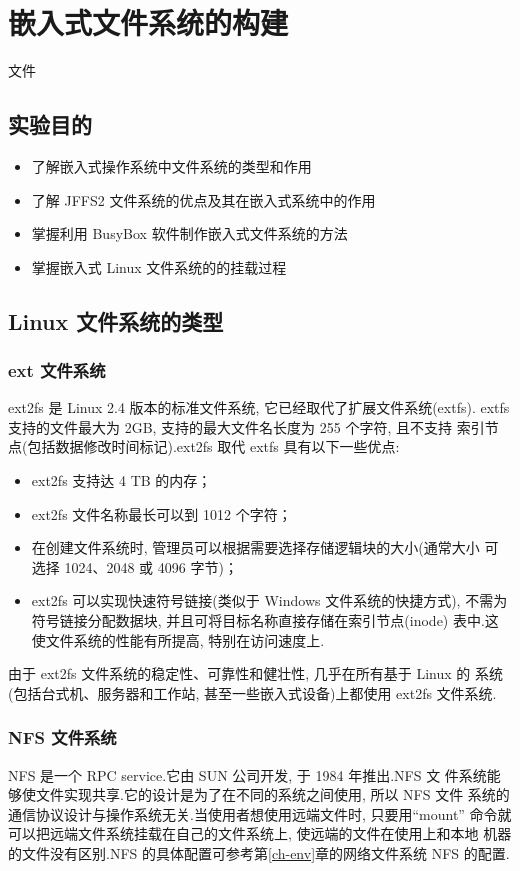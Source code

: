 \chapter{嵌入式文件系统的构建}{文件}\label{ch-fs}

\section{实验目的}
\begin{itemize}\itemsep=-3pt
  \item 了解嵌入式操作系统中文件系统的类型和作用
  \item 了解 JFFS2 文件系统的优点及其在嵌入式系统中的作用
  \item 掌握利用 BusyBox 软件制作嵌入式文件系统的方法
  \item 掌握嵌入式 Linux 文件系统的的挂载过程
\end{itemize}

\section{Linux 文件系统的类型}
\subsection{ext 文件系统}
	ext2fs 是 Linux 2.4 版本的标准文件系统, 它已经取代了扩展文件系统(extfs).
extfs 支持的文件最大为 2GB, 支持的最大文件名长度为 255 个字符, 且不支持
索引节点(包括数据修改时间标记).ext2fs 取代 extfs 具有以下一些优点:
\begin{itemize}\itemsep=-3pt
  \item ext2fs 支持达 4 TB 的内存；
  \item ext2fs 文件名称最长可以到 1012 个字符；
  \item 在创建文件系统时, 管理员可以根据需要选择存储逻辑块的大小(通常大小
		可选择 1024、2048 或 4096 字节)；
  \item ext2fs 可以实现快速符号链接(类似于 Windows 文件系统的快捷方式), 
		不需为符号链接分配数据块, 并且可将目标名称直接存储在索引节点(inode)
		表中.这使文件系统的性能有所提高, 特别在访问速度上.
\end{itemize}
	由于 ext2fs 文件系统的稳定性、可靠性和健壮性, 几乎在所有基于 Linux 的
系统(包括台式机、服务器和工作站, 甚至一些嵌入式设备)上都使用 ext2fs 文件系统.

\subsection{NFS 文件系统}
	NFS 是一个 RPC service.它由 SUN 公司开发, 于 1984 年推出.NFS 文
件系统能够使文件实现共享.它的设计是为了在不同的系统之间使用, 所以 NFS 文件
系统的通信协议设计与操作系统无关.当使用者想使用远端文件时, 只要用``mount''
命令就可以把远端文件系统挂载在自己的文件系统上, 使远端的文件在使用上和本地
机器的文件没有区别.NFS 的具体配置可参考第\ref{ch-env}章的网络文件系统 NFS
的配置.

